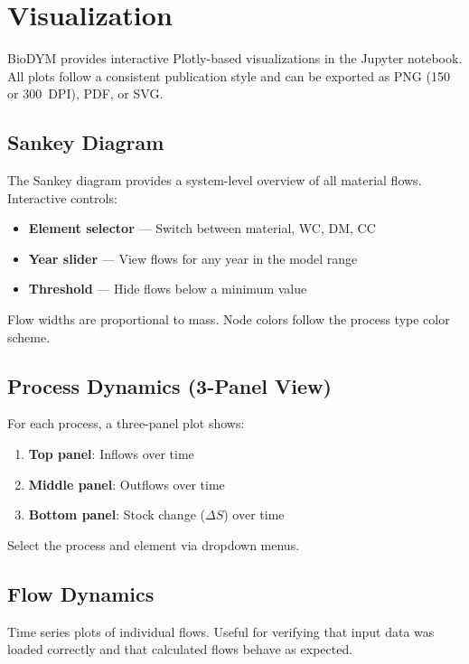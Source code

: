 \chapter{Visualization}
\label{ch:visualization}

BioDYM provides interactive Plotly-based visualizations in the Jupyter notebook. All plots follow a consistent publication style and can be exported as PNG (150 or 300~DPI), PDF, or SVG.

\section{Sankey Diagram}

The Sankey diagram provides a system-level overview of all material flows. Interactive controls:
\begin{itemize}
  \item \textbf{Element selector} --- Switch between material, WC, DM, CC
  \item \textbf{Year slider} --- View flows for any year in the model range
  \item \textbf{Threshold} --- Hide flows below a minimum value
\end{itemize}

Flow widths are proportional to mass. Node colors follow the process type color scheme.

\section{Process Dynamics (3-Panel View)}

For each process, a three-panel plot shows:
\begin{enumerate}
  \item \textbf{Top panel}: Inflows over time
  \item \textbf{Middle panel}: Outflows over time
  \item \textbf{Bottom panel}: Stock change ($\Delta S$) over time
\end{enumerate}

Select the process and element via dropdown menus.

\section{Flow Dynamics}

Time series plots of individual flows. Useful for verifying that input data was loaded correctly and that calculated flows behave as expected.

